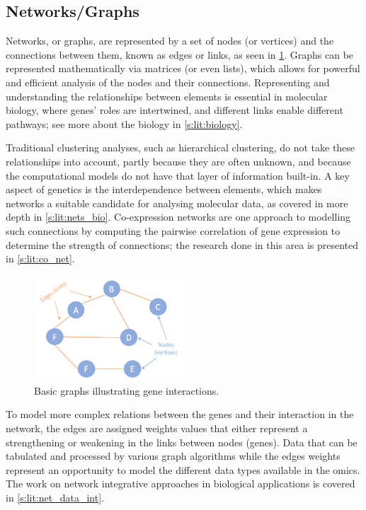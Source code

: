 \subsection{Networks/Graphs} \label{s:lit:graph_overview}

Networks, or graphs, are represented by a set of nodes (or vertices) and the connections between them, known as edges or links, as seen in \cref{fig:graphs_basic}. Graphs can be represented mathematically via matrices (or even lists), which allows for powerful and efficient analysis of the nodes and their connections. Representing and understanding the relationships between elements is essential in molecular biology, where genes' roles are intertwined, and different links enable different pathways; see more about the biology in \cref{s:lit:biology}.

Traditional clustering analyses, such as hierarchical clustering, do not take these relationships into account, partly because they are often unknown, and because the computational models do not have that layer of information built-in. A key aspect of genetics is the interdependence between elements, which makes networks a suitable candidate for analysing molecular data, as covered in more depth in \cref{s:lit:nets_bio}. Co-expression networks are one approach to modelling such connections by computing the pairwise correlation of gene expression to determine the strength of connections; the research done in this area is presented in \cref{s:lit:co_net}.

\begin{figure}[!htb]
  \centering\includegraphics[width=0.5\textwidth,height=0.5\textheight,keepaspectratio]{Sections/Lit_review/Resources/basic_graphs.png}
    \caption{Basic graphs illustrating gene interactions.}
    \label{fig:graphs_basic}
\end{figure}

To model more complex relations between the genes and their interaction in the network, the edges are assigned weights values that either represent a strengthening or weakening in the links between nodes (genes). Data that can be tabulated and processed by various graph algorithms while the edges weights represent an opportunity to model the different data types available in the omics. The work on network integrative approaches in biological applications is covered in \cref{s:lit:net_data_int}.

